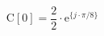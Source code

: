 \begin{center}
\[
\textrm{C}[0] = \frac{2}{2} \cdot \textrm{e}^{\{ j \cdot \pi/8 \}}
\]
\end{center}
